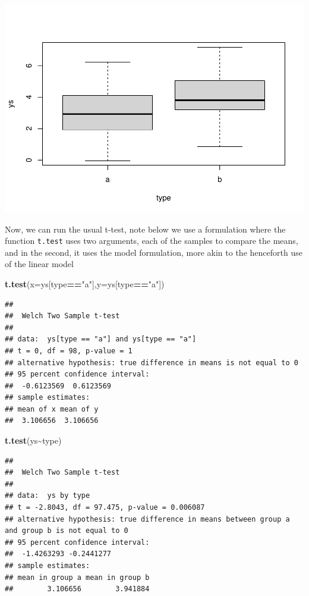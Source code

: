 \documentclass[
]{book}
\newenvironment{Shaded}{\begin{snugshade}}{\end{snugshade}}
\newcommand{\AttributeTok}[1]{\textcolor[rgb]{0.13,0.29,0.53}{#1}}
\newcommand{\FunctionTok}[1]{\textcolor[rgb]{0.13,0.29,0.53}{\textbf{#1}}}
\newcommand{\NormalTok}[1]{#1}
\newcommand{\SpecialCharTok}[1]{\textcolor[rgb]{0.81,0.36,0.00}{\textbf{#1}}}
\newcommand{\StringTok}[1]{\textcolor[rgb]{0.31,0.60,0.02}{#1}}
\begin{document}
\includegraphics{ECOMODbook_files/figure-latex/a8.7-1.pdf}

Now, we can run the usual t-test, note below we use a formulation where the function \texttt{t.test} uses two arguments, each of the samples to compare the means, and in the second, it uses the model formulation, more akin to the henceforth use of the linear model

\begin{Shaded}
\begin{Highlighting}[]
\FunctionTok{t.test}\NormalTok{(}\AttributeTok{x=}\NormalTok{ys[type}\SpecialCharTok{==}\StringTok{"a"}\NormalTok{],}\AttributeTok{y=}\NormalTok{ys[type}\SpecialCharTok{==}\StringTok{"a"}\NormalTok{])}
\end{Highlighting}
\end{Shaded}

\begin{verbatim}
## 
##  Welch Two Sample t-test
## 
## data:  ys[type == "a"] and ys[type == "a"]
## t = 0, df = 98, p-value = 1
## alternative hypothesis: true difference in means is not equal to 0
## 95 percent confidence interval:
##  -0.6123569  0.6123569
## sample estimates:
## mean of x mean of y 
##  3.106656  3.106656
\end{verbatim}

\begin{Shaded}
\begin{Highlighting}[]
\FunctionTok{t.test}\NormalTok{(ys}\SpecialCharTok{\textasciitilde{}}\NormalTok{type)}
\end{Highlighting}
\end{Shaded}

\begin{verbatim}
## 
##  Welch Two Sample t-test
## 
## data:  ys by type
## t = -2.8043, df = 97.475, p-value = 0.006087
## alternative hypothesis: true difference in means between group a and group b is not equal to 0
## 95 percent confidence interval:
##  -1.4263293 -0.2441277
## sample estimates:
## mean in group a mean in group b 
##        3.106656        3.941884
\end{verbatim}
\end{document}
